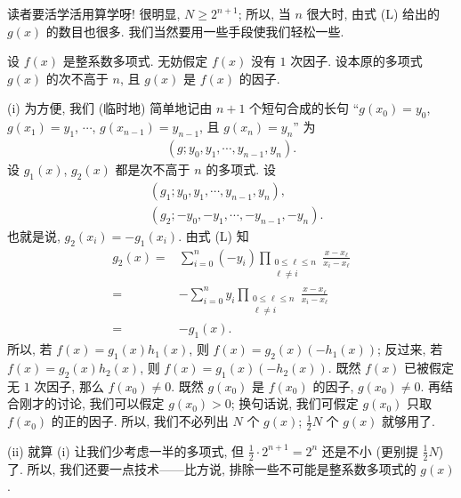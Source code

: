 \begin{remark}
    读者要活学活用算学呀! 很明显, $N \geq 2^{n+1}$; 所以, 当 $n$ 很大时, 由式 (L) 给出的 $g(x)$ 的数目也很多. 我们当然要用一些手段使我们轻松一些.

    设 $f(x)$ 是整系数多项式. 无妨假定 $f(x)$ 没有 $1$ 次因子. 设本原的多项式 $g(x)$ 的次不高于 $n$, 且 $g(x)$ 是 $f(x)$ 的因子.

    (i) 为方便, 我们 (临时地) 简单地记由 $n+1$ 个短句合成的长句 ``$g(x_0) = y_0$, $g(x_1) = y_1$, $\cdots$, $g(x_{n-1}) = y_{n-1}$, 且 $g(x_n) = y_n$'' 为
    \begin{align*}
        (g; y_0, y_1, \cdots, y_{n-1}, y_n).
    \end{align*}
    设 $g_1 (x)$, $g_2 (x)$ 都是次不高于 $n$ 的多项式. 设
    \begin{align*}
         & (g_1; y_0, y_1, \cdots, y_{n-1}, y_n),     \\
         & (g_2; -y_0, -y_1, \cdots, -y_{n-1}, -y_n).
    \end{align*}
    也就是说, $g_2 (x_i) = -g_1 (x_i)$. 由式 (L) 知
    \begin{align*}
        g_2 (x)
        = {} & \sum_{i = 0}^{n} (-y_i) \prod_{\begin{smallmatrix}0 \leq \ell \leq n \\\ell \neq i\end{smallmatrix}} \frac{x - x_\ell}{x_i - x_\ell} \\
        = {} & -\sum_{i = 0}^{n} y_i \prod_{\begin{smallmatrix}0 \leq \ell \leq n \\\ell \neq i\end{smallmatrix}} \frac{x - x_\ell}{x_i - x_\ell}   \\
        = {} & {-g_1 (x)}.
    \end{align*}
    所以, 若 $f(x) = g_1 (x) h_1 (x)$, 则 $f(x) = g_2 (x) (-h_1 (x))$; 反过来, 若 $f(x) = g_2 (x) h_2 (x)$, 则 $f(x) = g_1 (x) (-h_2 (x))$. 既然 $f(x)$ 已被假定无 $1$ 次因子, 那么 $f(x_0) \neq 0$. 既然 $g(x_0)$ 是 $f(x_0)$ 的因子, $g(x_0) \neq 0$. 再结合刚才的讨论, 我们可以假定 $g(x_0) > 0$; 换句话说, 我们可假定 $g(x_0)$ 只取 $f(x_0)$ 的正的因子. 所以, 我们不必列出 $N$ 个 $g(x)$; $\frac{1}{2} N$ 个 $g(x)$ 就够用了.

    (ii) 就算 (i) 让我们少考虑一半的多项式, 但 $\frac{1}{2} \cdot 2^{n+1} = 2^n$ 还是不小 (更别提 $\frac{1}{2} N$) 了. 所以, 我们还要一点技术——比方说, 排除一些不可能是整系数多项式的 $g(x)$.


\end{remark}
